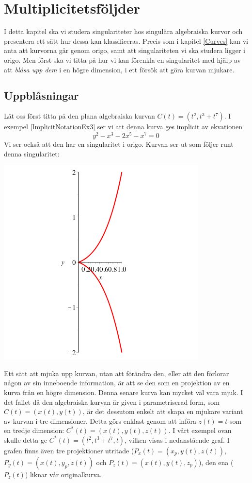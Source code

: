 \chapter{Multiplicitetsföljder}

I detta kapitel ska vi studera singulariteter hos singulära algebraiska kurvor och presentera ett sätt hur dessa kan klassificeras. Precis som i kapitel \ref{Curves} kan vi anta att kurvorna går genom origo, samt att singulariteten vi ska studera ligger i origo. Men först ska vi titta på hur vi kan förenkla en singularitet med hjälp av att \emph{blåsa upp dem} i en högre dimension, i ett försök att göra kurvan mjukare.

\section{Uppblåsningar}

Låt oss först titta på den plana algebraiska kurvan $C(t)=(t^2,t^3+t^7)$. I exempel \ref{ImplicitNotationEx3} ser vi att denna kurva ges implicit av ekvationen
\[y^2-x^3-2x^5-x^7 = 0\]
Vi ser också att den har en singularitet i origo. Kurvan ser ut som följer runt denna singularitet:

\begin{center}
\includegraphics[scale=0.35]{Export/blowupex1_1.png}
\end{center}

Ett sätt att mjuka upp kurvan, utan att förändra den, eller att den förlorar någon av sin inneboende information, är att se den som en projektion av en kurva från en högre dimension. Denna senare kurva kan mycket väl vara mjuk. I det fallet då den algebraiska kurvan är given i parametriserad form, som $C(t)=\left(x(t),y(t)\right)$, är det dessutom enkelt att skapa en mjukare variant av kurvan i tre dimensioner. Detta görs enklast genom att införa $z(t)=t$ som en tredje dimension: $C^*(t)=\left(x(t),y(t),z(t)\right)$. I vårt exempel ovan skulle detta ge $C^*(t)=(t^2,t^3+t^7,t)$, vilken visas i nedanstående graf. I grafen finns även tre projektioner utritade ($P_x(t)=(x_p,y(t),z(t))$, $P_y(t)=(x(t),y_p,z(t))$ och $P_z(t)=(x(t),y(t),z_p)$), den ena ($P_z(t)$) liknar vår originalkurva.

